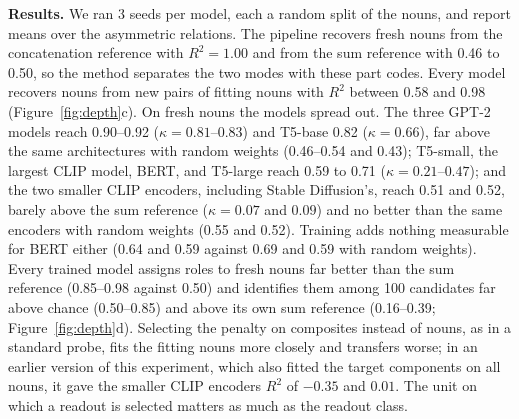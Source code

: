 \documentclass[10pt]{article}
\theoremstyle{plain}
\theoremstyle{remark}
\begin{document}
\textbf{Results.} We ran 3 seeds per model, each a random split of the nouns, and report means over the asymmetric relations. The pipeline recovers fresh nouns from the concatenation reference with $R^2 = 1.00$ and from the sum reference with 0.46 to 0.50, so the method separates the two modes with these part codes. Every model recovers nouns from new pairs of fitting nouns with $R^2$ between 0.58 and 0.98 (Figure~\ref{fig:depth}c). On fresh nouns the models spread out. The three GPT-2 models reach 0.90--0.92 ($\kappa = 0.81$--$0.83$) and T5-base 0.82 ($\kappa = 0.66$), far above the same architectures with random weights (0.46--0.54 and 0.43); T5-small, the largest CLIP model, BERT, and T5-large reach 0.59 to 0.71 ($\kappa = 0.21$--$0.47$); and the two smaller CLIP encoders, including Stable Diffusion's, reach 0.51 and 0.52, barely above the sum reference ($\kappa = 0.07$ and $0.09$) and no better than the same encoders with random weights (0.55 and 0.52). Training adds nothing measurable for BERT either (0.64 and 0.59 against 0.69 and 0.59 with random weights). Every trained model assigns roles to fresh nouns far better than the sum reference (0.85--0.98 against 0.50) and identifies them among 100 candidates far above chance (0.50--0.85) and above its own sum reference (0.16--0.39; Figure~\ref{fig:depth}d). Selecting the penalty on composites instead of nouns, as in a standard probe, fits the fitting nouns more closely and transfers worse; in an earlier version of this experiment, which also fitted the target components on all nouns, it gave the smaller CLIP encoders $R^2$ of $-0.35$ and $0.01$. The unit on which a readout is selected matters as much as the readout class.
\end{document}
